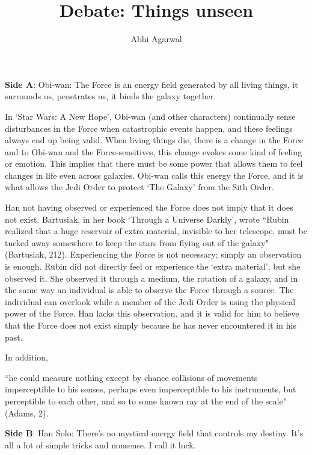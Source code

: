 \documentclass[11pt, oneside]{article}
\title{Debate: Things unseen\vspace{-0.4cm}}
\author{Abhi Agarwal\vspace{-1cm}}
\date{}
\begin{document}
\maketitle

\noindent \textbf{Side A}: Obi-wan: The Force is an energy field generated by all living things, it surrounds us, penetrates us, it binds the galaxy together.

\par In `Star Wars: A New Hope', Obi-wan (and other characters) continually sense disturbances in the Force when catastrophic events happen, and these feelings always end up being valid. When living things die, there is a change in the Force and to Obi-wan and the Force-sensitives, this change evokes some kind of feeling or emotion. This implies that there must be some power that allows them to feel changes in life even across galaxies. Obi-wan calls this energy the Force, and it is what allows the Jedi Order to protect `The Galaxy' from the Sith Order.

\par Han not having observed or experienced the Force does not imply that it does not exist. Bartusiak, in her book `Through a Universe Darkly', wrote ``Rubin realized that a huge reservoir of extra material, invisible to her telescope, must be tucked away somewhere to keep the stars from flying out of the galaxy" (Bartusiak, 212). Experiencing the Force is not necessary; simply an observation is enough. Rubin did not directly feel or experience the `extra material', but she observed it. She observed it through a medium, the rotation of a galaxy, and in the same way an individual is able to observe the Force through a source. The individual can overlook while a member of the Jedi Order is using the physical power of the Force. Han lacks this observation, and it is valid for him to believe that the Force does not exist simply because he has never encountered it in his past.

\par In addition, 

\par ``he could measure nothing except by chance collisions of movements imperceptible to his senses, perhaps even imperceptible to his instruments, but perceptible to each other, and so to some known ray at the end of the scale" (Adams, 2).

\noindent \textbf{Side B}: Han Solo: There's no mystical energy field that controls my destiny.  It's all a lot of simple tricks and nonsense.  I call it luck. 
\end{document}
